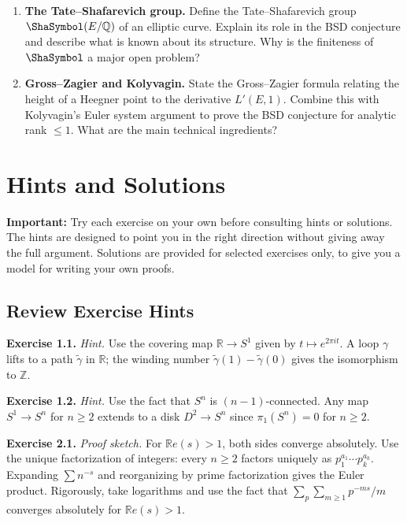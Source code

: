 \begin{enumerate}[label=\textbf{A7.\arabic*.},leftmargin=2.5em]
\item \textbf{The Tate--Shafarevich group.}
Define the Tate--Shafarevich group $\Sha(E/\mathbb{Q})$ of an elliptic curve. Explain its role in the BSD conjecture and describe what is known about its structure. Why is the finiteness of $\Sha$ a major open problem?

\item \textbf{Gross--Zagier and Kolyvagin.}
State the Gross--Zagier formula relating the height of a Heegner point to the derivative $L'(E, 1)$. Combine this with Kolyvagin's Euler system argument to prove the BSD conjecture for analytic rank $\leq 1$. What are the main technical ingredients?
\end{enumerate}

\section{Hints and Solutions}
\label{sec:hints}

\textbf{Important:} Try each exercise on your own before consulting hints or solutions. The hints are designed to point you in the right direction without giving away the full argument. Solutions are provided for selected exercises only, to give you a model for writing your own proofs.

\subsection{Review Exercise Hints}

\medskip\noindent\textbf{Exercise 1.1.} \textit{Hint.} Use the covering map $\mathbb{R} \to S^1$ given by $t \mapsto e^{2\pi i t}$. A loop $\gamma$ lifts to a path $\tilde{\gamma}$ in $\mathbb{R}$; the winding number $\tilde{\gamma}(1) - \tilde{\gamma}(0)$ gives the isomorphism to $\mathbb{Z}$.

\medskip\noindent\textbf{Exercise 1.2.} \textit{Hint.} Use the fact that $S^n$ is $(n-1)$-connected. Any map $S^1 \to S^n$ for $n \geq 2$ extends to a disk $D^2 \to S^n$ since $\pi_1(S^n) = 0$ for $n \geq 2$.

\medskip\noindent\textbf{Exercise 2.1.} \textit{Proof sketch.} For $\mathbb{R}e(s) > 1$, both sides converge absolutely. Use the unique factorization of integers: every $n \geq 2$ factors uniquely as $p_1^{a_1} \cdots p_k^{a_k}$. Expanding $\sum n^{-s}$ and reorganizing by prime factorization gives the Euler product. Rigorously, take logarithms and use the fact that $\sum_p \sum_{m \geq 1} p^{-ms}/m$ converges absolutely for $\mathbb{R}e(s) > 1$.

